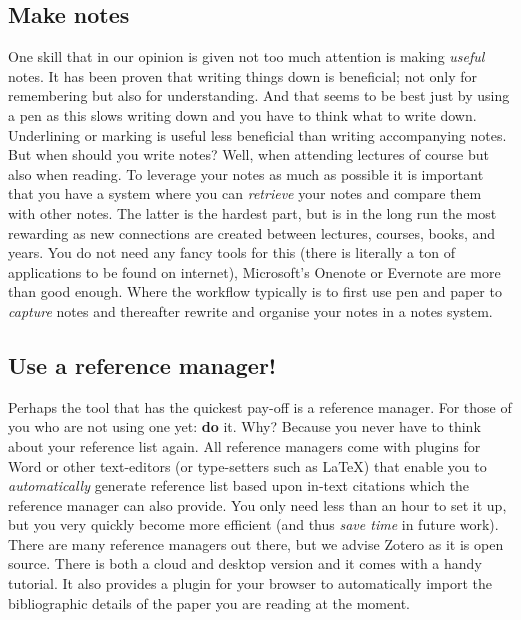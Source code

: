 \documentclass[
]{book}
\begin{document}
\hypertarget{make-notes}{%
\subsection{Make notes}\label{make-notes}}

One skill that in our opinion is given not too much attention is making \emph{useful} notes. It has been proven that writing things down is beneficial; not only for remembering but also for understanding. And that seems to be best just by using a pen as this slows writing down and you have to think what to write down. Underlining or marking is useful less beneficial than writing accompanying notes. But when should you write notes? Well, when attending lectures of course but also when reading. To leverage your notes as much as possible it is important that you have a system where you can \emph{retrieve} your notes and compare them with other notes. The latter is the hardest part, but is in the long run the most rewarding as new connections are created between lectures, courses, books, and years. You do not need any fancy tools for this (there is literally a ton of applications to be found on internet), Microsoft's Onenote or Evernote are more than good enough. Where the workflow typically is to first use pen and paper to \emph{capture} notes and thereafter rewrite and organise your notes in a notes system.

\hypertarget{use-a-reference-manager}{%
\subsection{Use a reference manager!}\label{use-a-reference-manager}}

Perhaps the tool that has the quickest pay-off is a reference manager. For those of you who are not using one yet: \textbf{do} it. Why? Because you never have to think about your reference list again. All reference managers come with plugins for Word or other text-editors (or type-setters such as LaTeX) that enable you to \emph{automatically} generate reference list based upon in-text citations which the reference manager can also provide. You only need less than an hour to set it up, but you very quickly become more efficient (and thus \emph{save time} in future work). There are many reference managers out there, but we advise Zotero as it is open source. There is both a cloud and desktop version and it comes with a handy tutorial. It also provides a plugin for your browser to automatically import the bibliographic details of the paper you are reading at the moment.
\end{document}
